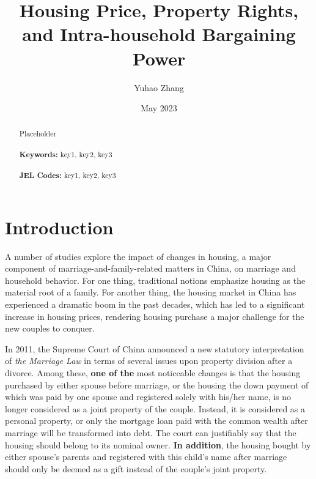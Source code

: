 \documentclass[11pt]{article}
\begin{document}
\begin{titlepage}
\title{Housing Price, Property Rights, and Intra-household Bargaining Power}
\author{Yuhao Zhang}
\date{May 2023}
\maketitle
\begin{abstract}
\noindent Placeholder\\
\vspace{0in}\\
\noindent\textbf{Keywords:} key1, key2, key3\\
\vspace{0in}\\
\noindent\textbf{JEL Codes:} key1, key2, key3\\

\bigskip
\end{abstract}
\setcounter{page}{0}
\thispagestyle{empty}
\end{titlepage}
\pagebreak \newpage


\section{Introduction} \label{sec:intro}
A number of studies explore the impact of changes in housing, a major component of marriage-and-family-related matters in China, on marriage and household behavior. For one thing, traditional notions emphasize housing as the material root of a family. For another thing, the housing market in China has experienced a dramatic boom in the past decades, which has led to a significant increase in housing prices, rendering housing purchase a major challenge for the new couples to conquer.

In 2011, the Supreme Court of China announced a new statutory interpretation of \textit{the Marriage Law} in terms of several issues upon property division after a divorce. Among these, \textbf{one of the} most noticeable changes is that the housing purchased by either spouse before marriage, or the housing the down payment of which was paid by one spouse and registered solely with his/her name, is no longer considered as a joint property of the couple. Instead, it is considered as a personal property, or only the mortgage loan paid with the common wealth after marriage will be transformed into debt. The court can justifiably say that the housing should belong to its nominal owner. \textbf{In addition}, the housing bought by either spouse's parents and registered with this child's name after marriage should only be deemed as a gift instead of the couple's joint property.
\end{document}
